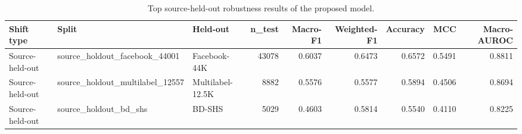 \begin{table}
\caption{Top source-held-out robustness results of the proposed model.}
\label{tab:robustness}
\begin{tabular}{lllrrrrrr}
\toprule
Shift type & Split & Held-out & n_test & Macro-F1 & Weighted-F1 & Accuracy & MCC & Macro-AUROC \\
\midrule
Source-held-out & source_holdout_facebook_44001 & Facebook-44K & 43078 & 0.6037 & 0.6473 & 0.6572 & 0.5491 & 0.8811 \\
Source-held-out & source_holdout_multilabel_12557 & Multilabel-12.5K & 8882 & 0.5576 & 0.5577 & 0.5894 & 0.4506 & 0.8694 \\
Source-held-out & source_holdout_bd_shs & BD-SHS & 5029 & 0.4603 & 0.5814 & 0.5540 & 0.4110 & 0.8225 \\
\bottomrule
\end{tabular}
\end{table}

